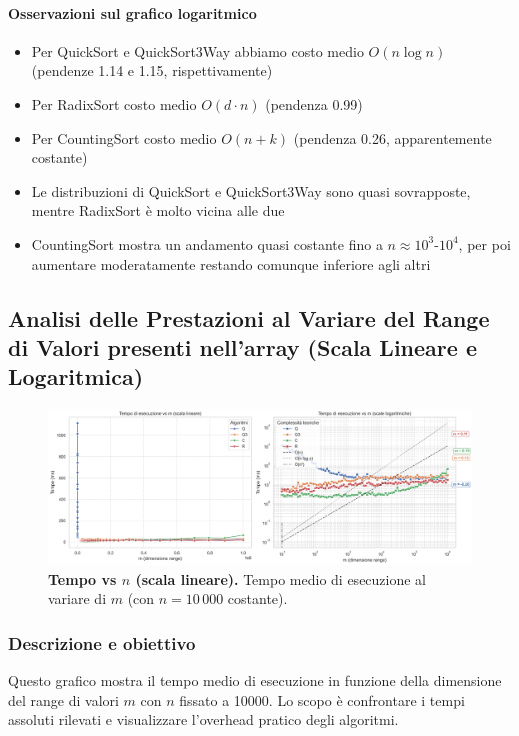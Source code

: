 \documentclass[a4paper, 11pt]{article}
\begin{document}
\paragraph{Osservazioni sul grafico logaritmico}
\begin{itemize}
  \item Per QuickSort e QuickSort3Way abbiamo costo medio $O(n \log n)$ (pendenze 1.14 e 1.15, rispettivamente)
  \item Per RadixSort costo medio $O(d \cdot n)$ (pendenza 0.99)
  \item Per CountingSort costo medio $O(n + k)$ (pendenza 0.26, apparentemente costante)
  \item Le distribuzioni di QuickSort e QuickSort3Way sono quasi sovrapposte, mentre RadixSort è molto vicina alle due
  \item CountingSort mostra un andamento quasi costante fino a $n \approx 10^3$-$10^4$, per poi aumentare moderatamente restando comunque inferiore agli altri
\end{itemize}

\subsection{Analisi delle Prestazioni al Variare del Range di Valori presenti nell'array (Scala Lineare e Logaritmica)}
\begin{figure}[H]
    \centering
    \includegraphics[width=\textwidth]{Immagini/confronto_algoritmi_m_variabile_DEF.png}
    \caption*{\textbf{Tempo vs \(n\) (scala lineare).} Tempo medio di esecuzione al variare di \(m\) (con \(n=10\,000\) costante).}
    \label{fig:grafico}
\end{figure}

\subsubsection{Descrizione e obiettivo}
\label{descrizione-obiettivo}
Questo grafico mostra il tempo medio di esecuzione in funzione della dimensione del range di valori \(m\) con \(n\) fissato a 10000. Lo scopo è confrontare i tempi assoluti rilevati e visualizzare l'overhead pratico degli algoritmi.
\end{document}
